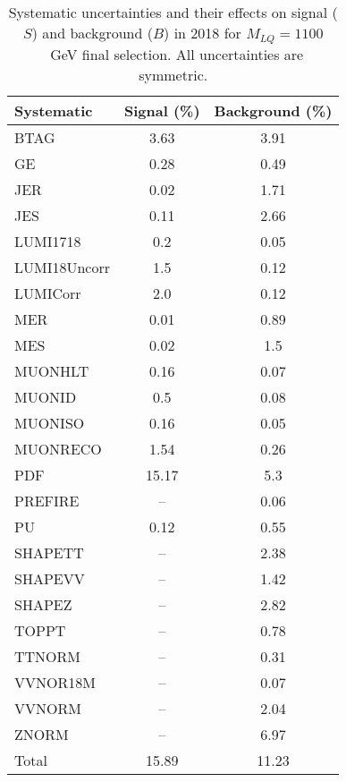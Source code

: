 \begin{table}[htbp]
\begin{center}
\caption{Systematic uncertainties and their effects on signal ($S$) and background ($B$) in 2018 for $M_{LQ}=1100$~GeV final selection. All uncertainties are symmetric.}
\begin{tabular}{lcc}
\hline\hline
Systematic & Signal (\%) & Background (\%) \\ \hline 
BTAG & 3.63 & 3.91\\ 
GE & 0.28 & 0.49\\ 
JER & 0.02 & 1.71\\ 
JES & 0.11 & 2.66\\ 
LUMI1718 & 0.2 & 0.05\\ 
LUMI18Uncorr & 1.5 & 0.12\\ 
LUMICorr & 2.0 & 0.12\\ 
MER & 0.01 & 0.89\\ 
MES & 0.02 & 1.5\\ 
MUONHLT & 0.16 & 0.07\\ 
MUONID & 0.5 & 0.08\\ 
MUONISO & 0.16 & 0.05\\ 
MUONRECO & 1.54 & 0.26\\ 
PDF & 15.17 & 5.3\\ 
PREFIRE & -- & 0.06\\ 
PU & 0.12 & 0.55\\ 
SHAPETT & -- & 2.38\\ 
SHAPEVV & -- & 1.42\\ 
SHAPEZ & -- & 2.82\\ 
TOPPT & -- & 0.78\\ 
TTNORM & -- & 0.31\\ 
VVNOR18M & -- & 0.07\\ 
VVNORM & -- & 2.04\\ 
ZNORM & -- & 6.97\\ 
Total & 15.89 & 11.23\\ \hline \hline
\end{tabular}
\label{tab:SysUncertainties_uujj_1100}
\end{center}
\end{table}

